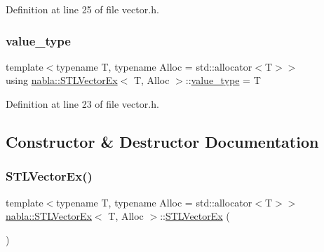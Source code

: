 Definition at line 25 of file vector.\+h.

\mbox{\label{classnabla_1_1_s_t_l_vector_ex_a6af5809443fb78a0fe7321ff93e2ad4c}} 
\subsubsection{\texorpdfstring{value\_type}{value\_type}}
{\footnotesize\ttfamily template$<$typename T, typename Alloc = std\+::allocator$<$\+T$>$$>$ \\
using \mbox{\hyperlink{classnabla_1_1_s_t_l_vector_ex}{nabla\+::\+S\+T\+L\+Vector\+Ex}}$<$ T, Alloc $>$\+::\mbox{\hyperlink{classnabla_1_1_s_t_l_vector_ex_a6af5809443fb78a0fe7321ff93e2ad4c}{value\+\_\+type}} =  T}



Definition at line 23 of file vector.\+h.



\subsection{Constructor \& Destructor Documentation}
\mbox{\label{classnabla_1_1_s_t_l_vector_ex_ac83be23a58d069f67572216c27307472}} 
\subsubsection{\texorpdfstring{STLVectorEx()}{STLVectorEx()}\hspace{0.1cm}{\footnotesize\ttfamily [1/3]}}
{\footnotesize\ttfamily template$<$typename T, typename Alloc = std\+::allocator$<$\+T$>$$>$ \\
\mbox{\hyperlink{classnabla_1_1_s_t_l_vector_ex}{nabla\+::\+S\+T\+L\+Vector\+Ex}}$<$ T, Alloc $>$\+::\mbox{\hyperlink{classnabla_1_1_s_t_l_vector_ex}{S\+T\+L\+Vector\+Ex}} (\begin{DoxyParamCaption}{ }\end{DoxyParamCaption})\hspace{0.3cm}{\ttfamily [inline]}}



